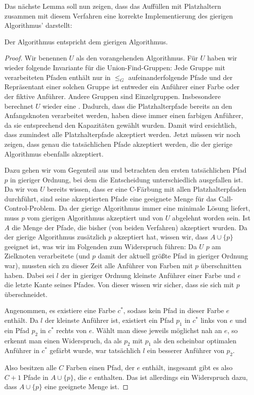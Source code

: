 Das nächste Lemma soll nun zeigen, dass das Auffüllen mit Platzhaltern zusammen mit diesem Verfahren eine korrekte
Implementierung des gierigen Algorithmus' darstellt:

\begin{lemma}
    Der  Algorithmus entspricht dem gierigen Algorithmus.
\end{lemma}
\begin{proof}
    Wir benennen $U$ als den vorangehenden Algorithmus.
    Für $U$ haben wir wieder folgende Invariante für die Union-Find-Gruppen:
    Jede Gruppe mit verarbeiteten Pfaden enthält nur in $\leq_G$ aufeinanderfolgende Pfade und der Repräsentant einer
    solchen Gruppe ist entweder ein Anführer einer Farbe oder der fiktive Anführer.
    Andere Gruppen sind Einzelgruppen.
    Insbesondere berechnet $U$ wieder eine .
    Dadurch, dass die Platzhalterpfade bereits an den Anfangsknoten verarbeitet werden, haben diese immer einen farbigen
    Anführer, da sie entsprechend den Kapazitäten gewählt wurden.
    Damit wird ersichtlich, dass zumindest alle Platzhalterpfade akzeptiert werden.
    Jetzt müssen wir noch zeigen, dass genau die tatsächlichen Pfade akzeptiert werden, die der gierige Algorithmus
    ebenfalls akzeptiert.

    Dazu gehen wir vom Gegenteil aus und betrachten den ersten tatsächlichen Pfad $p$ in gieriger Ordnung, bei dem die
    Entscheidung unterschiedlich ausgefallen ist.
    Da wir von $U$ bereits wissen, dass er eine C-Färbung mit allen Platzhalterpfaden durchführt, sind
    seine akzeptierten Pfade eine geeignete Menge für das Call-Control-Problem.
    Da der gierige Algorithmus immer eine minimale Lösung liefert, muss $p$ vom gierigen Algorithmus akzeptiert und von
    $U$ abgelehnt worden sein.
    Ist $A$ die Menge der Pfade, die bisher (von beiden Verfahren) akzeptiert wurden.
    Da der gierige Algorithmus zusätzlich $p$ akzeptiert hat, wissen wir, dass $A \cup \{p\}$ geeignet ist, was wir
    im Folgenden zum Widerspruch führen:
    Da $U$ $p$ am Zielknoten verarbeitete (und $p$ damit der aktuell größte Pfad in gieriger Ordnung
    war), mussten sich zu dieser Zeit alle Anführer von Farben mit $p$ überschnitten haben.
    Dabei sei $l$ der in gieriger Ordnung kleinste Anführer einer Farbe und $e$ die letzte Kante seines Pfades.
    Von dieser wissen wir sicher, dass sie sich mit $p$ überschneidet.

    Angenommen, es existiere eine Farbe $c^*$, sodass kein Pfad in dieser Farbe $e$ enthält.
    Da $l$ der kleinste Anführer ist, existiert ein Pfad $p_1$ in $c^*$ links von $e$ und ein Pfad $p_2$ in $c^*$
    rechts von $e$.
    Wählt man diese jeweils möglichst nah an $e$, so erkennt man einen Widerspruch, da als $p_2$ mit $p_1$ als den
    scheinbar optimalen Anführer in $c^*$ gefärbt wurde, war tatsächlich $l$ ein besserer Anführer von $p_2$.

    Also besitzen alle $C$ Farben einen Pfad, der $e$ enthält, insgesamt gibt es also $C+1$ Pfade in $A \cup \{p\}$, die
    $e$ enthalten.
    Das ist allerdings ein Widerspruch dazu, dass $A \cup \{p\}$ eine geeignete Menge ist.
\end{proof}

